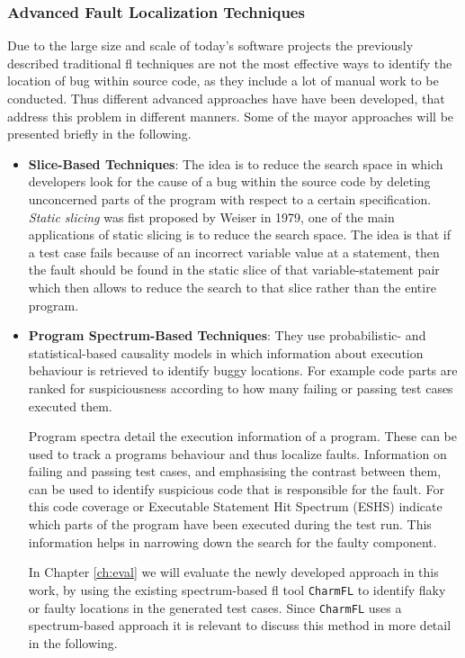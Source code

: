 \documentclass[
fancyheadings, %
%
%
]{stsreprt}
\begin{document}
\subsubsection{Advanced Fault Localization Techniques}
Due to the large size and scale of today's software projects the previously described traditional \acrshort{fl} techniques are not the most effective ways to identify the location of bug within source code, as they include a lot of manual work to be conducted. 
Thus different advanced approaches have have been developed, that address this problem in different manners. 
Some of the mayor approaches will be presented briefly in the following.
\begin{itemize}
    \item \textbf{Slice-Based Techniques}: The idea is to reduce the search space in which developers look for the cause of a bug within the source code by deleting unconcerned parts of the program with respect to a certain specification. 
    \textit{Static slicing} was fist proposed by Weiser in 1979, one of the main applications of static slicing \cite{slicing:1984} is to reduce the search space.
    The idea is that if a test case fails because of an incorrect variable value at a statement, then the fault should be found in the static slice of that variable-statement pair which then allows to reduce the search to that slice rather than the entire program. 
    \item \textbf{Program Spectrum-Based Techniques}: They use probabilistic- and statistical-based causality models in which information about execution behaviour is retrieved to identify buggy locations. For example code parts are ranked for suspiciousness according to how many failing or passing test cases executed them.\par
    Program spectra detail the execution information of a program. 
    These can be used to track a programs behaviour and thus localize faults. 
    Information on failing and passing test cases, and emphasising the contrast between them, can be used to identify suspicious code that is responsible for the fault. For this code coverage or Executable Statement Hit Spectrum (ESHS) indicate which parts of the program have been executed during the test run. 
    This information helps in narrowing down the search for the faulty component. \par
    In Chapter \ref{ch:eval} we will evaluate the newly developed approach in this work, by using the existing spectrum-based \acrshort{fl} tool \texttt{CharmFL} to identify flaky or faulty locations in the generated test cases. Since \texttt{CharmFL} uses a spectrum-based approach it is relevant to discuss this method in more detail in the following. \par 

\end{itemize}
\end{document}

